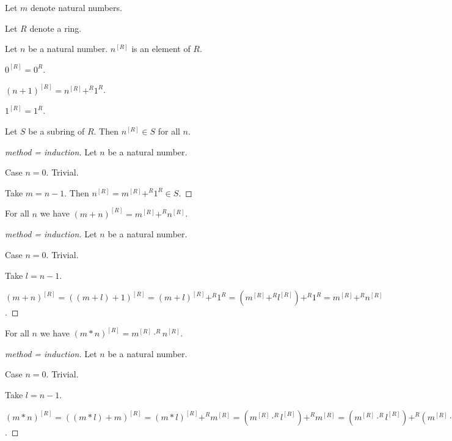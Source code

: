 \documentclass[english,11pt]{article}
\begin{document}
\begin{forthel}

Let $m$ denote natural numbers.

Let $R$ denote a ring.

\begin{signature} Let $n$ be a natural number. $n^{[R]}$ is an element of $R$.
\end{signature}

\begin{axiom} $0^{[R]} = 0^{R}$.
\end{axiom}

\begin{axiom} $(n+1)^{[R]} = n^{[R]} +^{R} 1^{R}$.
\end{axiom}

\begin{lemma}
$1^{[R]} = 1^{R}$.
\end{lemma}

\begin{lemma}
Let $S$ be a subring of $R$. Then $n^{[R]} \in S$ for all $n$.
\end{lemma}
\begin{proof}[method = induction]
Let $n$ be a natural number.

Case $n = 0$. Trivial.

Take $m = n - 1$. Then $n^{[R]} = m^{[R]} +^{R} 1^{R} \in S$.
\end{proof}

\begin{lemma}
For all $n$ we have
$(m + n)^{[R]} = m^{[R]} +^{R} n^{[R]}$.
\end{lemma}
\begin{proof}[method = induction]
Let $n$ be a natural number.

Case $n = 0$. Trivial.

Take $l = n - 1$.

$(m + n)^{[R]} = 
((m + l) + 1)^{[R]} =
(m + l)^{[R]} +^{R} 1^{R} =
(m^{[R]} +^{R} l^{[R]}) +^{R} 1^{R} =
m^{[R]} +^{R} n^{[R]}$.
\end{proof}

\begin{lemma}
For all $n$ we have
$(m * n)^{[R]} = m^{[R]} \cdot^{R} n^{[R]}$.
\end{lemma}
\begin{proof}[method = induction]
Let $n$ be a natural number.

Case $n = 0$. Trivial.

Take $l = n - 1$.

$(m * n)^{[R]} = 
((m * l) + m)^{[R]} =
(m * l)^{[R]} +^{R} m^{[R]} =
(m^{[R]} \cdot^{R} l^{[R]}) +^{R} m^{[R]} =
(m^{[R]} \cdot^{R} l^{[R]}) +^{R} (m^{[R]} \cdot^{R} 1^{R}) =
m^{[R]} \cdot^{R} (l + 1)^{[R]}$.
\end{proof}


\end{forthel}
\end{document}
